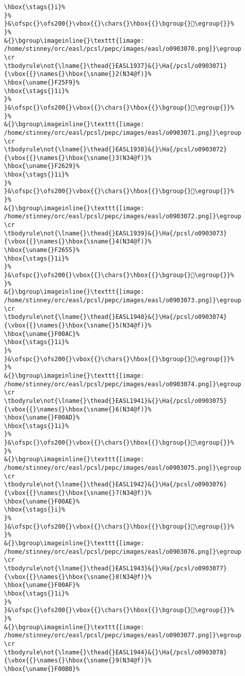 \begin{verbatim}
\hbox{\stags{}i}%
}%
}&\ofspc{}\ofs200{}\vbox{{}\chars{}\hbox{{}\bgroup{}󲖻\egroup{}}%
}%
&{}\bgroup\imageinline{}\texttt{[image: /home/stinney/orc/easl/pcsl/pepc/images/easl/o0903070.png]}\egroup
\cr
\tbodyrule\not{\lname{}\thead{}EASL1937}&{}\Ha{/pcsl/o0903071}{\vbox{{}\names{}\hbox{\sname{}2(N34@f)}%
\hbox{\uname{}F25F9}%
\hbox{\stags{}1i}%
}%
}&\ofspc{}\ofs200{}\vbox{{}\chars{}\hbox{{}\bgroup{}󲗹\egroup{}}%
}%
&{}\bgroup\imageinline{}\texttt{[image: /home/stinney/orc/easl/pcsl/pepc/images/easl/o0903071.png]}\egroup
\cr
\tbodyrule\not{\lname{}\thead{}EASL1938}&{}\Ha{/pcsl/o0903072}{\vbox{{}\names{}\hbox{\sname{}3(N34@f)}%
\hbox{\uname{}F2629}%
\hbox{\stags{}1i}%
}%
}&\ofspc{}\ofs200{}\vbox{{}\chars{}\hbox{{}\bgroup{}󲘩\egroup{}}%
}%
&{}\bgroup\imageinline{}\texttt{[image: /home/stinney/orc/easl/pcsl/pepc/images/easl/o0903072.png]}\egroup
\cr
\tbodyrule\not{\lname{}\thead{}EASL1939}&{}\Ha{/pcsl/o0903073}{\vbox{{}\names{}\hbox{\sname{}4(N34@f)}%
\hbox{\uname{}F2655}%
\hbox{\stags{}1i}%
}%
}&\ofspc{}\ofs200{}\vbox{{}\chars{}\hbox{{}\bgroup{}󲙕\egroup{}}%
}%
&{}\bgroup\imageinline{}\texttt{[image: /home/stinney/orc/easl/pcsl/pepc/images/easl/o0903073.png]}\egroup
\cr
\tbodyrule\not{\lname{}\thead{}EASL1940}&{}\Ha{/pcsl/o0903074}{\vbox{{}\names{}\hbox{\sname{}5(N34@f)}%
\hbox{\uname{}F00AC}%
\hbox{\stags{}1i}%
}%
}&\ofspc{}\ofs200{}\vbox{{}\chars{}\hbox{{}\bgroup{}󰂬\egroup{}}%
}%
&{}\bgroup\imageinline{}\texttt{[image: /home/stinney/orc/easl/pcsl/pepc/images/easl/o0903074.png]}\egroup
\cr
\tbodyrule\not{\lname{}\thead{}EASL1941}&{}\Ha{/pcsl/o0903075}{\vbox{{}\names{}\hbox{\sname{}6(N34@f)}%
\hbox{\uname{}F00AD}%
\hbox{\stags{}1i}%
}%
}&\ofspc{}\ofs200{}\vbox{{}\chars{}\hbox{{}\bgroup{}󰂭\egroup{}}%
}%
&{}\bgroup\imageinline{}\texttt{[image: /home/stinney/orc/easl/pcsl/pepc/images/easl/o0903075.png]}\egroup
\cr
\tbodyrule\not{\lname{}\thead{}EASL1942}&{}\Ha{/pcsl/o0903076}{\vbox{{}\names{}\hbox{\sname{}7(N34@f)}%
\hbox{\uname{}F00AE}%
\hbox{\stags{}i}%
}%
}&\ofspc{}\ofs200{}\vbox{{}\chars{}\hbox{{}\bgroup{}󰂮\egroup{}}%
}%
&{}\bgroup\imageinline{}\texttt{[image: /home/stinney/orc/easl/pcsl/pepc/images/easl/o0903076.png]}\egroup
\cr
\tbodyrule\not{\lname{}\thead{}EASL1943}&{}\Ha{/pcsl/o0903077}{\vbox{{}\names{}\hbox{\sname{}8(N34@f)}%
\hbox{\uname{}F00AF}%
\hbox{\stags{}1i}%
}%
}&\ofspc{}\ofs200{}\vbox{{}\chars{}\hbox{{}\bgroup{}󰂯\egroup{}}%
}%
&{}\bgroup\imageinline{}\texttt{[image: /home/stinney/orc/easl/pcsl/pepc/images/easl/o0903077.png]}\egroup
\cr
\tbodyrule\not{\lname{}\thead{}EASL1944}&{}\Ha{/pcsl/o0903078}{\vbox{{}\names{}\hbox{\sname{}9(N34@f)}%
\hbox{\uname{}F00B0}%

\end{verbatim}
